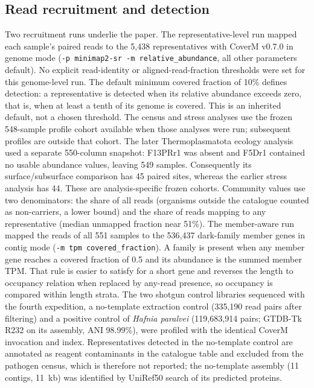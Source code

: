 \documentclass[11pt]{article}
\begin{document}
\subsection*{Read recruitment and detection}
Two recruitment runs underlie the paper. The representative-level run mapped each sample's paired
reads to the 5{,}438 representatives with CoverM v0.7.0 \citep{aroney2025coverm} in genome mode
(\texttt{-p minimap2-sr -m relative\_abundance}, all other parameters default). No explicit read-identity or aligned-read-fraction thresholds were set for this genome-level run. The default minimum
covered fraction of 10\% defines detection: a representative is detected when its relative abundance
exceeds zero, that is, when at least a tenth of its genome is covered. This is an inherited default,
not a chosen threshold. The census and stress analyses use the frozen 548-sample profile cohort available when those analyses were run; subsequent profiles are outside that cohort. The later Thermoplasmatota ecology analysis used a separate 550-column snapshot: F13PRr1 was absent and F5Dr1 contained no usable abundance values, leaving 549 samples. Consequently its surface/subsurface comparison has 45 paired sites, whereas the earlier stress analysis has 44. These are analysis-specific frozen cohorts. Community values use two denominators: the share of all reads (organisms outside
the catalogue counted as non-carriers, a lower bound) and the share of reads mapping to any
representative (median unmapped fraction near 51\%). The member-aware run mapped the reads of all 551
samples to the 536{,}437 dark-family member genes in contig mode (\texttt{-m tpm covered\_fraction}).
A family is present when any member gene reaches a covered fraction of 0.5 and its abundance is the
summed member TPM. That rule is easier to satisfy for a short gene and reverses the length to
occupancy relation when replaced by any-read presence, so occupancy is compared within length strata.
The two shotgun control libraries sequenced with the fourth expedition, a no-template extraction
control (335{,}190 read pairs after filtering) and a positive control of \emph{Hafnia paralvei}
(119{,}683{,}914 pairs; GTDB-Tk R232 on its assembly, ANI 98.99\%), were profiled with the identical
CoverM invocation and index. Representatives detected in the no-template control are annotated as
reagent contaminants in the catalogue table and excluded from the pathogen census, which is
therefore not reported; the no-template assembly (11 contigs, 11~kb) was identified by UniRef50
search of its predicted proteins.
\end{document}
